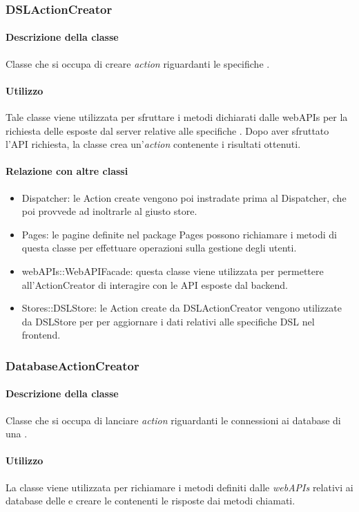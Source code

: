 \subsubsection{DSLActionCreator}
\paragraph*{Descrizione della classe}
Classe che si occupa di creare \textit{action} riguardanti le specifiche .
\paragraph*{Utilizzo}
Tale classe viene utilizzata per sfruttare i metodi dichiarati dalle webAPIs per la richiesta delle  esposte dal server relative alle specifiche . Dopo aver sfruttato l'API richiesta, la classe crea un'\textit{action} contenente i risultati ottenuti.

\paragraph*{Relazione con altre classi}
\begin{itemize}
\item Dispatcher: le Action create vengono poi instradate prima al Dispatcher, che poi provvede ad inoltrarle al giusto store.
\item Pages: le pagine definite nel package Pages possono richiamare i metodi di questa classe per effettuare operazioni sulla gestione degli utenti.
\item webAPIs::WebAPIFacade: questa classe viene utilizzata per permettere all'ActionCreator di interagire con le API esposte dal backend.
\item Stores::DSLStore: le Action create da DSLActionCreator vengono utilizzate da DSLStore per per aggiornare i dati relativi alle specifiche DSL nel frontend.
\end{itemize}

\subsubsection{DatabaseActionCreator}
\paragraph*{Descrizione della classe}
Classe che si occupa di lanciare \textit{action} riguardanti le connessioni ai database di una .
\paragraph*{Utilizzo}
La classe viene utilizzata per richiamare i metodi definiti dalle \textit{webAPIs} relativi ai database delle  e creare le  contenenti le risposte dai metodi chiamati.
